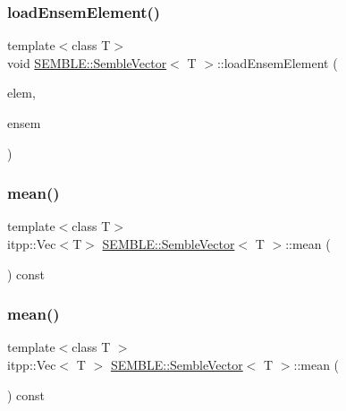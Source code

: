 \subsubsection{\texorpdfstring{loadEnsemElement()}{loadEnsemElement()}\hspace{0.1cm}{\footnotesize\ttfamily [2/2]}}
{\footnotesize\ttfamily template$<$class T$>$ \\
void \mbox{\hyperlink{structSEMBLE_1_1SembleVector}{S\+E\+M\+B\+L\+E\+::\+Semble\+Vector}}$<$ T $>$\+::load\+Ensem\+Element (\begin{DoxyParamCaption}\item[{int}]{elem,  }\item[{const typename \mbox{\hyperlink{structSEMBLE_1_1PromoteEnsem}{Promote\+Ensem}}$<$ T $>$\+::Type \&}]{ensem }\end{DoxyParamCaption})}

\mbox{\label{structSEMBLE_1_1SembleVector_aaac1723366a1522771a7bb57edea1bfb}} 
\subsubsection{\texorpdfstring{mean()}{mean()}\hspace{0.1cm}{\footnotesize\ttfamily [1/2]}}
{\footnotesize\ttfamily template$<$class T$>$ \\
itpp\+::\+Vec$<$T$>$ \mbox{\hyperlink{structSEMBLE_1_1SembleVector}{S\+E\+M\+B\+L\+E\+::\+Semble\+Vector}}$<$ T $>$\+::mean (\begin{DoxyParamCaption}\item[{void}]{ }\end{DoxyParamCaption}) const}

\mbox{\label{structSEMBLE_1_1SembleVector_acb34740f7232e5d1bf079cf131192322}} 
\subsubsection{\texorpdfstring{mean()}{mean()}\hspace{0.1cm}{\footnotesize\ttfamily [2/2]}}
{\footnotesize\ttfamily template$<$class T $>$ \\
itpp\+::\+Vec$<$ T $>$ \mbox{\hyperlink{structSEMBLE_1_1SembleVector}{S\+E\+M\+B\+L\+E\+::\+Semble\+Vector}}$<$ T $>$\+::mean (\begin{DoxyParamCaption}\item[{void}]{ }\end{DoxyParamCaption}) const}

